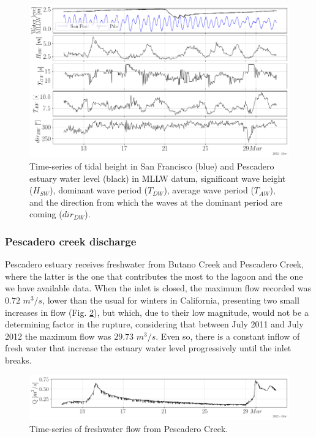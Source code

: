 \documentclass[tesis.tex]{subfiles}
\begin{document}
\begin{figure}[h!]
    \centering
    \includegraphics[width=\textwidth]{Imagenes/wave1.png}
    \caption{Time-series of tidal height in San Francisco (blue) and Pescadero estuary water level (black) in MLLW datum, significant wave height ($H_{SW}$), dominant wave period ($T_{DW}$), average wave period ($T_{AW}$), and the direction from which the waves at the dominant period are coming ($dir_{DW}$).}
    \label{fig:wave1}
\end{figure}

\subsubsection{Pescadero creek discharge}

Pescadero estuary receives freshwater from Butano Creek and Pescadero Creek, where the latter is the one that contributes the most to the lagoon and the one we have available data. When the inlet is closed, the maximum flow recorded was $0.72$ $m^3/s$, lower than the usual for winters in California, presenting two small increases in flow (Fig. \ref{fig:q}), but which, due to their low magnitude, would not be a determining factor in the rupture, considering that between July 2011 and July 2012 the maximum flow was $29.73$ $m^3/s$. Even so, there is a constant inflow of fresh water that increase the estuary water level progressively until the inlet breaks.  

\begin{figure}[h!]
    \centering
    \includegraphics[width=\textwidth]{Imagenes/Q.png}
    \caption{Time-series of freshwater flow from Pescadero Creek.}
    \label{fig:q}
\end{figure}
\end{document}
